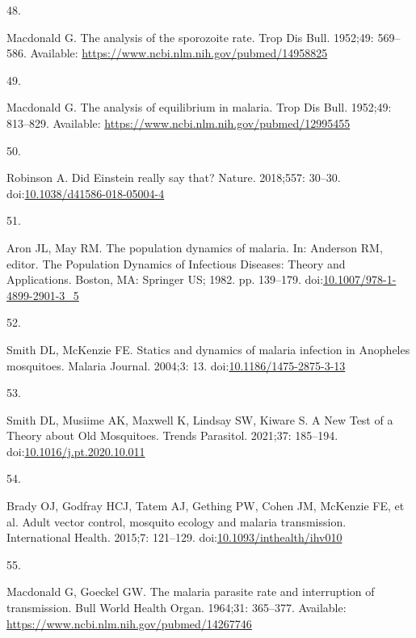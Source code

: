 \documentclass[
]{book}
\newlength{\cslhangindent}
\newlength{\csllabelwidth}
\newlength{\cslentryspacingunit} %
\newenvironment{CSLReferences}[2] %
 {%
  \setlength{\parindent}{0pt}
  \ifodd #1
  \let\oldpar\par
  \def\par{\hangindent=\cslhangindent\oldpar}
  \fi
  \setlength{\parskip}{#2\cslentryspacingunit}
 }%
 {}
\newcommand{\CSLLeftMargin}[1]{\parbox[t]{\csllabelwidth}{#1}}
\newcommand{\CSLRightInline}[1]{\parbox[t]{\linewidth - \csllabelwidth}{#1}\break}
\begin{document}
\begin{CSLReferences}{0}{0}
\leavevmode{}%
\CSLLeftMargin{48. }%
\CSLRightInline{Macdonald G. The analysis of the sporozoite rate. Trop Dis Bull. 1952;49: 569--586. Available: \url{https://www.ncbi.nlm.nih.gov/pubmed/14958825}}

\leavevmode{}%
\CSLLeftMargin{49. }%
\CSLRightInline{Macdonald G. The analysis of equilibrium in malaria. Trop Dis Bull. 1952;49: 813--829. Available: \url{https://www.ncbi.nlm.nih.gov/pubmed/12995455}}

\leavevmode{}%
\CSLLeftMargin{50. }%
\CSLRightInline{Robinson A. Did {Einstein} really say that? Nature. 2018;557: 30--30. doi:\href{https://doi.org/10.1038/d41586-018-05004-4}{10.1038/d41586-018-05004-4}}

\leavevmode{}%
\CSLLeftMargin{51. }%
\CSLRightInline{Aron JL, May RM. The population dynamics of malaria. In: Anderson RM, editor. The {Population} {Dynamics} of {Infectious} {Diseases}: {Theory} and {Applications}. Boston, MA: Springer US; 1982. pp. 139--179. doi:\href{https://doi.org/10.1007/978-1-4899-2901-3_5}{10.1007/978-1-4899-2901-3\_5}}

\leavevmode{}%
\CSLLeftMargin{52. }%
\CSLRightInline{Smith DL, McKenzie FE. Statics and dynamics of malaria infection in {Anopheles} mosquitoes. Malaria Journal. 2004;3: 13. doi:\href{https://doi.org/10.1186/1475-2875-3-13}{10.1186/1475-2875-3-13}}

\leavevmode{}%
\CSLLeftMargin{53. }%
\CSLRightInline{Smith DL, Musiime AK, Maxwell K, Lindsay SW, Kiware S. A {New} {Test} of a {Theory} about {Old} {Mosquitoes}. Trends Parasitol. 2021;37: 185--194. doi:\href{https://doi.org/10.1016/j.pt.2020.10.011}{10.1016/j.pt.2020.10.011}}

\leavevmode{}%
\CSLLeftMargin{54. }%
\CSLRightInline{Brady OJ, Godfray HCJ, Tatem AJ, Gething PW, Cohen JM, McKenzie FE, et al. Adult vector control, mosquito ecology and malaria transmission. International Health. 2015;7: 121--129. doi:\href{https://doi.org/10.1093/inthealth/ihv010}{10.1093/inthealth/ihv010}}

\leavevmode{}%
\CSLLeftMargin{55. }%
\CSLRightInline{Macdonald G, Goeckel GW. The malaria parasite rate and interruption of transmission. Bull World Health Organ. 1964;31: 365--377. Available: \url{https://www.ncbi.nlm.nih.gov/pubmed/14267746}}


\end{CSLReferences}
\end{document}
